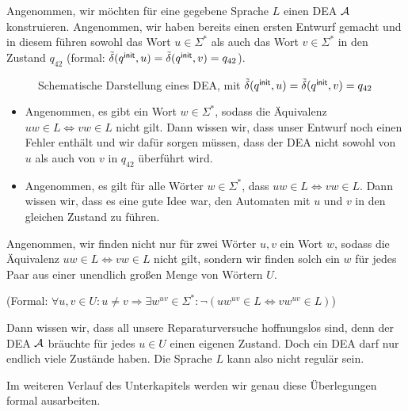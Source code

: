 {Angenommen, wir möchten für eine gegebene Sprache $L$ einen \ac{DEA} $\mathcal{A}$ konstruieren.
Angenommen, wir haben bereits einen ersten Entwurf gemacht und in diesem führen sowohl das Wort $u\in\Sigma^*$
als auch das Wort $v\in\Sigma^*$ in den Zustand $q_{42}$ (formal: $\tilde\delta(q^\mathsf{init}, u) = \tilde\delta(q^\mathsf{init}, v) = q_{42}$).
\begin{figure}[H]\centering
	\caption{Schematische Darstellung eines \ac{DEA}, mit $\tilde\delta(q^\mathsf{init}, u) = \tilde\delta(q^\mathsf{init}, v) = q_{42}$}
\end{figure}
\begin{itemize}
 \item Angenommen, es gibt ein Wort $w\in\Sigma^*$, sodass die Äquivalenz $uw\in L \Leftrightarrow vw\in L$ nicht gilt.
 Dann wissen wir, dass unser Entwurf noch einen Fehler enthält und wir dafür sorgen müssen, 
 dass der \ac{DEA} nicht sowohl von $u$
 als auch von $v$ in $q_{42}$ überführt wird.
 \item Angenommen, es gilt für alle Wörter $w\in\Sigma^*$, dass $uw\in L\Leftrightarrow vw\in L$.
 Dann wissen wir, dass es eine gute Idee war, den Automaten mit $u$ und $v$ in den gleichen Zustand zu führen.
\end{itemize}
Angenommen, wir finden nicht nur für zwei Wörter $u,v$ ein Wort $w$, sodass die Äquivalenz $uw\in L \Leftrightarrow vw\in L$ nicht gilt,
sondern wir finden solch ein $w$ für jedes Paar aus einer unendlich großen Menge von Wörtern $U$.
\begin{center}
(Formal: $\forall u,v\in U: u\neq v \Rightarrow \exists w^{uv}\in\Sigma^*: \neg(uw^{uv}\in L \Leftrightarrow vw^{uv}\in L)$) 
\end{center}
Dann wissen wir, dass all unsere Reparaturversuche hoffnungslos sind,
denn der \ac{DEA} $\mathcal{A}$ bräuchte für jedes $u\in U$ einen eigenen Zustand.
Doch ein \ac{DEA} darf nur endlich viele Zustände haben.
Die Sprache $L$ kann also nicht regulär sein.

Im weiteren Verlauf des Unterkapitels werden wir genau diese Überlegungen formal ausarbeiten.
}

